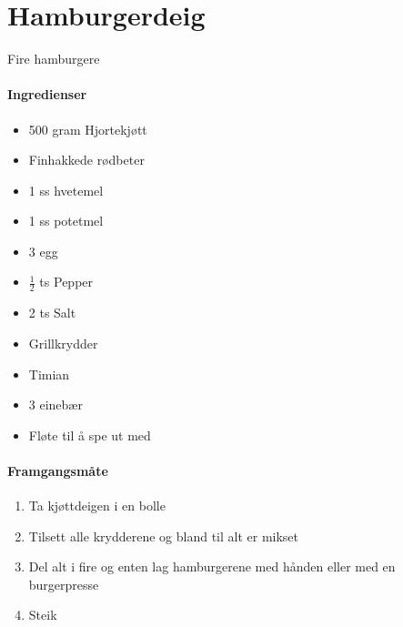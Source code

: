 \section{﻿Hamburgerdeig}
Fire hamburgere

%
\paragraph{Ingredienser}
\begin{itemize}[noitemsep]
	\item 500 gram Hjortekjøtt
	\item	Finhakkede rødbeter
	\item	1 ss hvetemel
	\item	1 ss potetmel
	\item	3 egg
	\item	 $\frac{1}{2}$  ts Pepper
	\item	2 ts Salt
	\item	Grillkrydder
	\item	Timian
	\item	3 einebær
	\item	Fløte til å spe ut med
\end{itemize}

\paragraph{Framgangsmåte}
\begin{enumerate}[noitemsep]
	\item Ta kjøttdeigen i en bolle
	\item Tilsett alle krydderene og bland til alt er mikset
	\item Del alt i fire og enten lag hamburgerene med hånden eller med en burgerpresse
	\item Steik
\end{enumerate}
